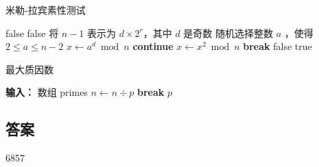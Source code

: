 \begin{algorithm}
	\caption{米勒-拉宾素性测试}
	\begin{algorithmic}[1]
		 
		\Return false
		\EndIf
		\Return false
		\EndIf
		\State 将 \( n - 1 \) 表示为 \( d \times 2^r \)，其中 \( d \) 是奇数
		\State 随机选择整数 \( a \) ，使得 \( 2 \leqslant a \leqslant n-2 \)
		\State \( x \gets a^d \bmod n \)
		\textbf{continue}
		\EndIf
		\State \( x \gets x^2 \bmod n \)
		\textbf{break}
		\EndIf
		\EndFor
		\Return false
		\EndIf
		\EndFor
		\Return true
		\EndFunction
	\end{algorithmic}
\end{algorithm}

\begin{algorithm}
	\caption{最大质因数}
	\begin{algorithmic}[1]
		\State \textbf{输入：} 数组 primes
		\State \( n \gets n \div p \)
		\EndWhile
		\State \textbf{break}
		\EndIf
		\EndFor
		\Return \( p \)
		\EndFunction
	\end{algorithmic}
\end{algorithm}

\subsection{答案}
6857

